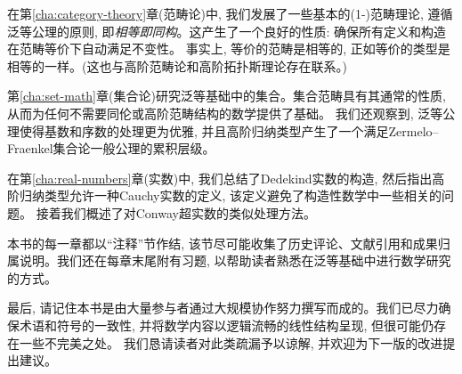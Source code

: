 在第\ref{cha:category-theory}章(范畴论)中, 我们发展了一些基本的(1-)范畴理论, 遵循泛等公理的原则, 即\emph{相等即同构}。这产生了一个良好的性质: 确保所有定义和构造在范畴等价下自动满足不变性。
事实上, 等价的范畴是相等的, 正如等价的类型是相等的一样。(这也与高阶范畴论和高阶拓扑斯理论存在联系。)

第\ref{cha:set-math}章(集合论)研究泛等基础中的集合。集合范畴具有其通常的性质, 从而为任何不需要同伦或高阶范畴结构的数学提供了基础。
我们还观察到, 泛等公理使得基数和序数的处理更为优雅, 并且高阶归纳类型产生了一个满足Zermelo--Fraenkel集合论一般公理的累积层级。

在第\ref{cha:real-numbers}章(实数)中, 我们总结了Dedekind实数的构造, 然后指出高阶归纳类型允许一种Cauchy实数的定义, 该定义避免了构造性数学中一些相关的问题。
接着我们概述了对Conway超实数的类似处理方法。

本书的每一章都以``注释''节作结, 该节尽可能收集了历史评论、文献引用和成果归属说明。我们还在每章末尾附有习题, 以帮助读者熟悉在泛等基础中进行数学研究的方式。

最后, 请记住本书是由大量参与者通过大规模协作努力撰写而成的。我们已尽力确保术语和符号的一致性, 并将数学内容以逻辑流畅的线性结构呈现, 但很可能仍存在一些不完美之处。
我们恳请读者对此类疏漏予以谅解, 并欢迎为下一版的改进提出建议。

